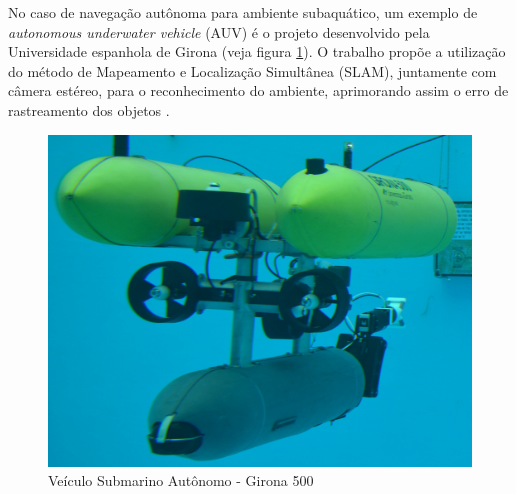 No caso de navegação autônoma para ambiente subaquático, um exemplo de \textit{autonomous underwater vehicle} (AUV) é o projeto desenvolvido pela Universidade espanhola de Girona (veja figura \ref{G500}). O trabalho propõe a utilização do método de Mapeamento e Localização Simultânea (SLAM), juntamente com câmera estéreo, para o reconhecimento do ambiente, aprimorando assim o erro de rastreamento dos objetos \cite{Nagappa2013}.

\begin{figure}[H]
 	\centering
 	\includegraphics[scale=0.1]{./Resources/G500.jpg}
 	\caption{Veículo Submarino Autônomo - Girona 500}
 	\label{G500}
\end{figure}


